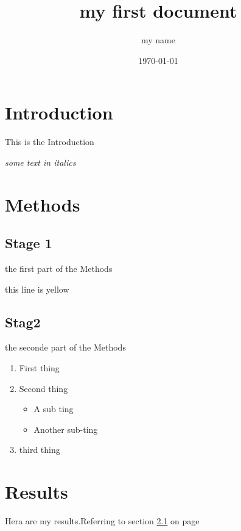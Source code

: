 \documentclass[a4paper,12pt]{article}
\begin{document}
\title{my first document}
\author{my name}
\date{\today}
\maketitle

\tableofcontents
\newpage
{}


\section{Introduction}
This is the Introduction

\textit{some text in italics}
\section{Methods}
\subsection{Stage 1}
\label{sec1}
the first part of the Methods

{\color{red}this line is yellow}

\subsection{Stag2 }
the seconde part of the Methods

\begin{enumerate}
	\item First thing
	\item Second thing
	\begin{itemize}
		\item A sub ting
		\item Another sub-ting
	\end{itemize}
	\item third thing
\end{enumerate}
\section{Results}
Hera are my results.Referring to section \ref{sec1} on page \pageref{sec1}
\end{document}
